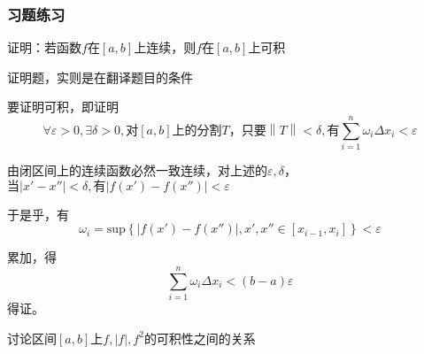 \documentclass[lang=cn,10pt]{elegantbook}
\begin{document}
\subsubsection{习题练习}
\begin{example}
	证明：若函数$f$在$[a,b]$上连续，则$f$在$[a,b]$上可积
\end{example}
\begin{solution}
	
	证明题，实则是在翻译题目的条件
	
	要证明可积，即证明
	\begin{equation*}
		\forall \varepsilon >0,\exists \delta >0,\text{对}\left[ a,b \right] \text{上的分割}T\text{，只要}\left\| T \right\| <\delta ,\text{有}\sum_{i=1}^n{\omega _i\varDelta x_i<\varepsilon}		
	\end{equation*}
	
	由闭区间上的连续函数必然一致连续，对上述的$\varepsilon , \delta $，$\text{当}|x\prime-x''|<\delta ,\text{有}|f\left( x\prime \right) -f\left( x'' \right) |<\varepsilon$ 
	
	于是乎，有
	\begin{equation*}
		\omega _i=\mathrm{sup}\left\{ |f\left( x\prime \right) -f\left( x'' \right) |,x\prime,x''\in \left[ x_{i-1},x_i \right] \right\} <\varepsilon 
	\end{equation*}
	
	累加，得
	\begin{equation*}
		\sum_{i=1}^n{\omega _i\varDelta x_i<(b-a)\varepsilon}
	\end{equation*}
	得证。
\end{solution}
\begin{example}
	讨论区间$[a,b]$上$f,|f|,f^{2}$的可积性之间的关系
\end{example}
\end{document}

